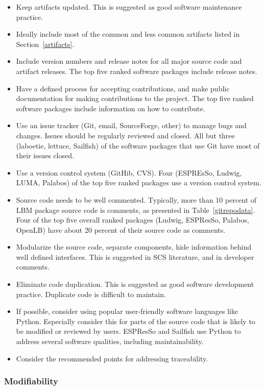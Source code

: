 \documentclass[final, 3p, times, authoryear]{elsarticle}
\begin{document}
\begin{itemize}
	\item Keep artifacts updated. This is suggested as good software maintenance practice.
	\item Ideally include most of the common and less common artifacts listed in Section~\ref{artifacts}.
	\item Include version numbers and release notes for all major source code and artifact releases. The top five ranked software packages include release notes.
	\item Have a defined process for accepting contributions, and make public documentation for making contributions to the project. The top five ranked software packages include information on how to contribute. 
	\item Use an issue tracker (Git, email, SourceForge, other) to manage bugs and changes. Issues should be regularly reviewed and closed. All but three (laboetie, lettuce, Sailfish) of the software packages that use Git have most of their issues closed.
	\item Use a version control system (GitHib, CVS). Four (ESPREsSo, Ludwig, LUMA, Palabos) of the top five ranked packages use a version control system.
	\item Source code needs to be well commented. Typically, more than 10 percent of LBM package source code is comments, as presented in Table~\ref{gitrepodata}. Four of the top five overall ranked packages (Ludwig, ESPResSo, Palabos, OpenLB) have about 20 percent of their source code as comments.
	\item Modularize the source code, separate components, hide information behind well defined interfaces. This is suggested in SCS literature, and in developer comments.
	\item Eliminate code duplication. This is suggested as good software development practice. Duplicate code is difficult to maintain.
	\item If possible, consider using popular user-friendly software languages like Python. Especially consider this for parts of the source code that is likely to be modified or reviewed by users. ESPResSo and Sailfish use Python to address several software qualities, including maintainability.
	\item Consider the recommended points for addressing traceability.
\end{itemize}

\subsubsection{Modifiability}
\end{document}
